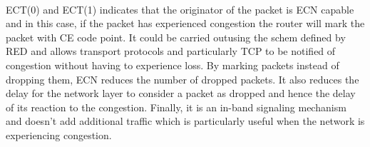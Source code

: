 \\ECT(0) and ECT(1) indicates that the originator of the packet is ECN capable and in this case, if the packet has experienced congestion the router will mark the packet with CE code point. It could be carried outusing the schem defined by RED and allows transport protocols and particularly TCP to be notified of congestion without having to experience loss. 
By marking packets instead of dropping them, ECN reduces the number of dropped packets. It also reduces the delay for the network layer to consider a packet as dropped and hence the delay of its reaction to the congestion. Finally, it is an in-band signaling mechanism and doesn't add additional traffic which is particularly useful when the network is experiencing congestion.




